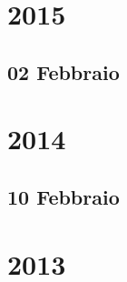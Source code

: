\documentclass[12pt,a4paper]{report}
\begin{document}
 

\maketitle
\tableofcontents
 
\chapter{2015}
\section{02 Febbraio}









\chapter{2014}
\section{10 Febbraio}









\chapter{2013}



 
\end{document}
